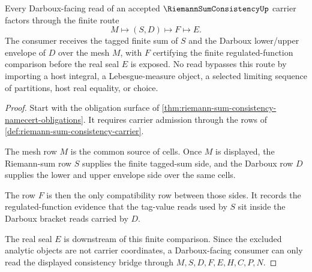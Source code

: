 \begin{theorem}
\label{thm:riemann-sum-consistency-darboux-bridge}
Every Darboux-facing read of an accepted $\RiemannSumConsistencyUp$ carrier factors through the finite route
$$
M\longmapsto (S,D)\longmapsto F\longmapsto E .
$$
The consumer receives the tagged finite sum of $S$ and the Darboux lower/upper envelope of $D$ over the mesh $M$, with $F$ certifying the finite regulated-function comparison before the real seal $E$ is exposed. No read bypasses this route by importing a host integral, a Lebesgue-measure object, a selected limiting sequence of partitions, host real equality, or choice.
\end{theorem}
\begin{proof}
Start with the obligation surface of \autoref{thm:riemann-sum-consistency-namecert-obligations}. It requires carrier admission through the rows of \autoref{def:riemann-sum-consistency-carrier}.

The mesh row $M$ is the common source of cells. Once $M$ is displayed, the Riemann-sum row $S$ supplies the finite tagged-sum side, and the Darboux row $D$ supplies the lower and upper envelope side over the same cells.

The row $F$ is then the only compatibility row between those sides. It records the regulated-function evidence that the tag-value reads used by $S$ sit inside the Darboux bracket reads carried by $D$.

The real seal $E$ is downstream of this finite comparison. Since the excluded analytic objects are not carrier coordinates, a Darboux-facing consumer can only read the displayed consistency bridge through $M,S,D,F,E,H,C,P,N$.
\end{proof}

